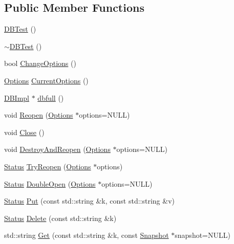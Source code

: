 \subsection*{Public Member Functions}
\begin{DoxyCompactItemize}
\item 
\hyperlink{classleveldb_1_1_d_b_test_afc6fc9512e900de6ee10c5db15b22930}{D\+B\+Test} ()
\item 
\hyperlink{classleveldb_1_1_d_b_test_a2268045d59c3a74bba03877819e36b55}{$\sim$\+D\+B\+Test} ()
\item 
bool \hyperlink{classleveldb_1_1_d_b_test_a587534fe403016f15cf1997ef7a40836}{Change\+Options} ()
\item 
\hyperlink{structleveldb_1_1_options}{Options} \hyperlink{classleveldb_1_1_d_b_test_a68db410e16195a3b67822bec05c06547}{Current\+Options} ()
\item 
\hyperlink{classleveldb_1_1_d_b_impl}{D\+B\+Impl} $\ast$ \hyperlink{classleveldb_1_1_d_b_test_a67de35d247ea077c1e4fdf2a7a0f0514}{dbfull} ()
\item 
void \hyperlink{classleveldb_1_1_d_b_test_a38170a082cbc71fb446408ff5634c797}{Reopen} (\hyperlink{structleveldb_1_1_options}{Options} $\ast$options=N\+U\+L\+L)
\item 
void \hyperlink{classleveldb_1_1_d_b_test_aee76446bbb9c34cdb1ae00318689aead}{Close} ()
\item 
void \hyperlink{classleveldb_1_1_d_b_test_ab798a43e7feab6dddc8fa1eb7a5f61f6}{Destroy\+And\+Reopen} (\hyperlink{structleveldb_1_1_options}{Options} $\ast$options=N\+U\+L\+L)
\item 
\hyperlink{classleveldb_1_1_status}{Status} \hyperlink{classleveldb_1_1_d_b_test_aee588b2d13db6be2a651a8fabeac5c79}{Try\+Reopen} (\hyperlink{structleveldb_1_1_options}{Options} $\ast$options)
\item 
\hyperlink{classleveldb_1_1_status}{Status} \hyperlink{classleveldb_1_1_d_b_test_aaf18040f36d28207e2f56c35ebccf360}{Double\+Open} (\hyperlink{structleveldb_1_1_options}{Options} $\ast$options=N\+U\+L\+L)
\item 
\hyperlink{classleveldb_1_1_status}{Status} \hyperlink{classleveldb_1_1_d_b_test_a5ec1a1d5ecc1744f325159eb81e46514}{Put} (const std\+::string \&k, const std\+::string \&v)
\item 
\hyperlink{classleveldb_1_1_status}{Status} \hyperlink{classleveldb_1_1_d_b_test_a25716ec93d525adbeea8ff71e8f3a9f4}{Delete} (const std\+::string \&k)
\item 
std\+::string \hyperlink{classleveldb_1_1_d_b_test_a6af558e1fca4a9f1bbf86d72d3d4aa6c}{Get} (const std\+::string \&k, const \hyperlink{classleveldb_1_1_snapshot}{Snapshot} $\ast$snapshot=N\+U\+L\+L)

\end{DoxyCompactItemize}
